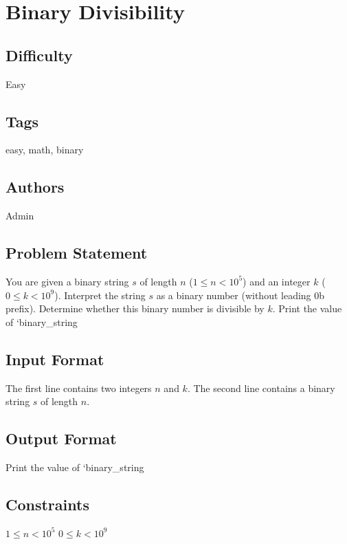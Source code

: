 \documentclass{article}
\newcommand{\ProblemTitle}{Binary Divisibility}
\newcommand{\Difficulty}{Easy}
\newcommand{\Tags}{easy, math, binary}
\newcommand{\Authors}{Admin}
\newcommand{\Statement}{
You are given a binary string $s$ of length $n$ ($1 \leq n < 10^5$) and an integer $k$ ($0 \leq k < 10^9$).
Interpret the string $s$ as a binary number (without leading 0b prefix).
Determine whether this binary number is divisible by $k$.
Print the value of `binary_string %
}
\newcommand{\InputFormat}{
The first line contains two integers $n$ and $k$.
The second line contains a binary string $s$ of length $n$.
}
\newcommand{\OutputFormat}{
Print the value of `binary_string %
}
\newcommand{\Constraints}{
\begin{itemize}
    $1 \leq n < 10^5$
    $0 \leq k < 10^9$
\end{itemize}
}
\begin{document}
\section*{\ProblemTitle}

\subsection*{Difficulty}
\Difficulty

\subsection*{Tags}
\Tags

\subsection*{Authors}
\Authors

\subsection*{Problem Statement}
\Statement

\subsection*{Input Format}
\InputFormat

\subsection*{Output Format}
\OutputFormat

\subsection*{Constraints}
\Constraints
\end{document}
